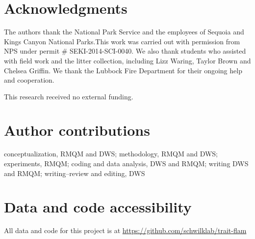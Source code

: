 \documentclass[letterpaper,12pt]{article}
\begin{document}
\section*{Acknowledgments}

The authors thank the National Park Service and the employees
  of Sequoia and Kings Canyon National Parks.This work was carried out with
  permission from NPS under permit \# SEKI-2014-SCI-0040. We also thank
  students who assisted with field work and the litter collection, including
  Lizz Waring, Taylor Brown and Chelsea Griffin. We thank the Lubbock Fire
  Department for their ongoing help and cooperation.


This research received no external funding.

\section*{Author contributions}
  conceptualization, RMQM and DWS; methodology, RMQM and
  DWS; experiments, RMQM; coding and data analysis, DWS and RMQM; writing DWS
  and RMQM; writing--review and editing, DWS

\section*{Data and code accessibility}
All data and code for this project is at \url{https://github.com/schwilklab/trait-flam}

\newpage







\end{document}

